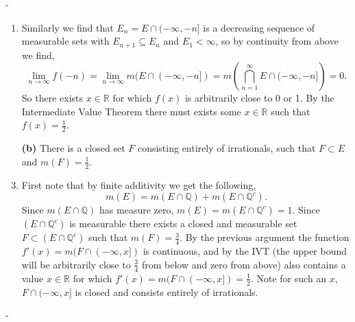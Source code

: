 \documentclass[12pt]{article}
\makeatletter
\theoremstyle{ex215}
\newcounter{probcount}
\newlength\probsep
\newlength\pshrinking
\newenvironment{problems}%
  {\ifhmode\unskip\par\fi\setcounter{probcount}{0}\probsep\parskip
  \sbox\@tempboxa{\textbf{9.}}\pshrinking\wd\@tempboxa\advance\pshrinking\labelsep
  \advance\linewidth -\pshrinking
  \advance\@totalleftmargin\pshrinking
  \advance\leftskip\pshrinking}%
  {\ifhmode\unskip \par\fi\advance\leftskip-\pshrinking}%
\renewenvironment{proof}[1][\proofname]{\par
  \pushQED{\qed}%
  \normalfont \topsep6\p@\@plus6\p@\relax
  \trivlist
  \@topsep \topsep
  \item[\hskip\labelsep
        \itshape
    #1\@addpunct{.}]\ignorespaces
}{%
  \popQED\endtrivlist\@endpefalse
}
\newcommand{\Reals}{\ensuremath{\mathbb R}}
\newcommand{\QQ}{\ensuremath{\mathbb Q}}
\let\RR\Reals
\makeatother
\begin{document}
\begin{problems}
\begin{enumerate}
\begin{proof}
      Similarly we find that $E_n = E \cap (-\infty, -n]$ is a decreasing sequence of measurable sets with $E_{n+1} \subseteq E_{n}$ and $E_1 < \infty$, so by continuity from above we find,
      \begin{equation*}
        \lim_{n \to \infty} f(-n) = \lim_{n \to \infty} m(E \cap (-\infty, -n]) = m\left(\bigcap_{n = 1}^\infty E \cap  (-\infty, -n]\right) = 0.
      \end{equation*}
      So there exists $x \in \RR$ for which $f(x)$ is arbitrarily close to 0 or 1. By the Intermediate Value Theorem there must exists some $x \in \RR$ such that $f(x) = \frac{1}{2}$. 
    \end{proof}
  \vspace*{.15in}

    \item[\textbf{(b)}] There is a closed set $F $ consisting entirely of irrationals, such that $F \subset E $ and $m(F) = \frac{1}{2}$.  
    \begin{proof} First note that by finite additivity we get the following, 
      \begin{equation*}
        m(E) = m(E \cap \QQ) + m(E \cap \QQ^c). 
      \end{equation*}
      Since $ m(E \cap \QQ)$ has measure zero, $m(E) =  m(E \cap \QQ^c) = 1$. Since $(E \cap \QQ^c)$ is measurable there exists a closed and measurable set $F \subset (E \cap \QQ^c) $ such that $m(F) = \frac{3}{4}$. By the previous argument the function $f'(x) = m(F \cap (-\infty, x])$ is continuous, and by the IVT (the upper bound will be arbitrarily close to $\frac{3}{4}$ from below and zero from above) also contains a value $x \in \RR$ for which $f'(x) = m(F \cap (-\infty, x]) = \frac{1}{2}$. Note for such an $x$, $F \cap (-\infty, x]$ is closed and consists entirely of irrationals. 
  \end{proof}
  \vspace*{.15in}



\end{enumerate}
\end{problems}
\end{document}
